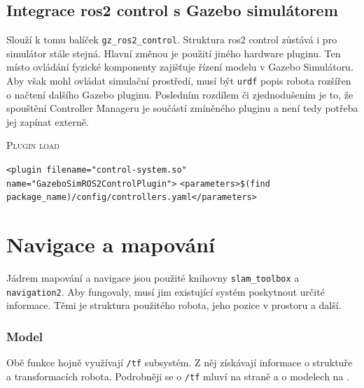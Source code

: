 \subsection*{Integrace ros2 control s Gazebo simulátorem}
Slouží k tomu balíček \verb|gz_ros2_control|. Struktura ros2 control zůstává i pro simulátor stále stejná. Hlavní změnou je použití jiného hardware pluginu. Ten místo ovládání fyzické komponenty zajišťuje řízení modelu v Gazebo Simulátoru. Aby však mohl ovládat simulační prostředí, musí být \verb|urdf| popis robota rozšířen o načtení dalšího Gazebo pluginu. Posledním rozdílem či zjednodušením je to, že spouštění Controller Manageru je součástí zmíněného pluginu a není tedy potřeba jej zapínat externě.

\begin{algorithm}[h!]
	\label{}
	\caption{\textsc{Plugin load}}
	
	\DontPrintSemicolon
	\SetAlgoNoLine
	\SetNlSty{}{}{:}
	\SetNlSkip{-1.1em}
	
	\BlankLine \Indp\Indpp
	
	\texttt{<plugin filename="control-system.so" name="GazeboSimROS2ControlPlugin">}\;
	\Indp
	\texttt{<parameters>\$(find package\_name)/config/controllers.yaml</parameters>}\;
	
\end{algorithm}

\newpage
\section{Navigace a mapování}
Jádrem mapování a navigace jsou použité knihovny \verb|slam_toolbox| a \verb|navigation2|. Aby fungovaly, musí jim existující systém poskytnout určité informace. Těmi je struktura použitého robota, jeho pozice v prostoru a další.

\subsubsection*{Model}
Obě funkce hojně využívají \verb|/tf| subsystém. Z něj získávají informace o struktuře a transformacích robota. Podrobněji se o \verb|/tf| mluví na straně \pageref{theory:tf} a o modelech na \pageref{implementation:model}.

